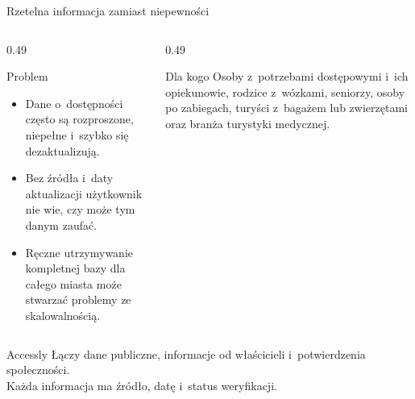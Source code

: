 \begin{frame}{Rzetelna informacja zamiast niepewności}
  \begin{columns}[T,onlytextwidth]
    \begin{column}{0.49\textwidth}
      \begin{block}{Problem}
        \begin{itemize}
          \item Dane o~dostępności często są rozproszone, niepełne i~szybko się dezaktualizują.
          \item Bez źródła i~daty aktualizacji użytkownik nie wie, czy może tym danym zaufać.
          \item Ręczne utrzymywanie kompletnej bazy dla całego miasta może stwarzać problemy ze skalowalnością.
        \end{itemize}
      \end{block}
    \end{column}
    \begin{column}{0.49\textwidth}
      \begin{block}{Dla kogo}
        Osoby z~potrzebami dostępowymi i~ich opiekunowie, rodzice z~wózkami, seniorzy, osoby po zabiegach,
        turyści z~bagażem lub zwierzętami oraz branża turystyki medycznej.
      \end{block}
    \end{column}
  \end{columns}
  \vspace{1mm}
  \begin{exampleblock}{Accessly}
    Łączy dane publiczne, informacje od właścicieli i~potwierdzenia społeczności.\\
    Każda informacja ma źródło, datę i~status weryfikacji.
  \end{exampleblock}

\end{frame}

